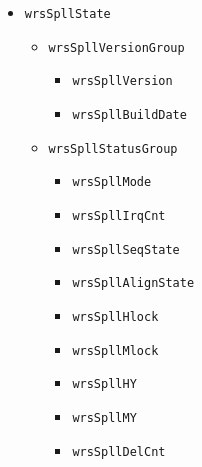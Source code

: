 \begin{itemize}
  \item \texttt{wrsSpllState}
    \begin{itemize}
      \item \texttt{wrsSpllVersionGroup}
	\begin{itemize}
	  \item \texttt{wrsSpllVersion}
	  \item \texttt{wrsSpllBuildDate}
	\end{itemize}
      \item \texttt{wrsSpllStatusGroup}
	\begin{itemize}
	  \item \texttt{wrsSpllMode}
	  \item \texttt{wrsSpllIrqCnt}
	  \item \texttt{wrsSpllSeqState}
	  \item \texttt{wrsSpllAlignState}
	  \item \texttt{wrsSpllHlock}
	  \item \texttt{wrsSpllMlock}
	  \item \texttt{wrsSpllHY}
	  \item \texttt{wrsSpllMY}
	  \item \texttt{wrsSpllDelCnt}
	\end{itemize}
    \end{itemize}


\end{itemize}
